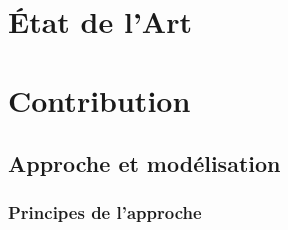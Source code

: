 










\part*{État de l'Art}
















\part*{Contribution}

\chapter{Approche et modélisation}\label{chap:mod}
\minitoc
\section{Principes de l'approche}\label{sec:principes}


